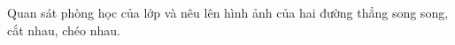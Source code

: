 

\begin{bt}%

	Quan sát phòng học của lớp và nêu lên hình ảnh của hai đường thẳng song song, cắt nhau, chéo nhau.
\end{bt}

